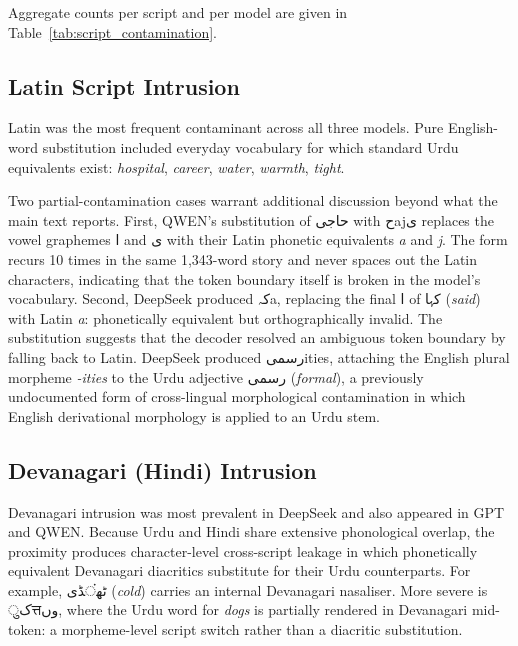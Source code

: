 \documentclass[11pt]{article}
\begin{document}
Aggregate counts per script and per model are given in
Table~\ref{tab:script_contamination}.



\subsection{Latin Script Intrusion}
\label{app:contamination_latin}

Latin was the most frequent contaminant across all three
models. Pure English-word substitution included everyday
vocabulary for which standard Urdu equivalents exist:
\textit{hospital}, \textit{career}, \textit{water},
\textit{warmth}, \textit{tight}.

Two partial-contamination cases warrant additional
discussion beyond what the main text reports. First, QWEN's
substitution of
\foreignlanguage{arabic}{حاجی} with
\foreignlanguage{arabic}{ح}aj\foreignlanguage{arabic}{ی}
replaces the vowel graphemes
\foreignlanguage{arabic}{ا} and \foreignlanguage{arabic}{ی}
with their Latin phonetic equivalents \textit{a} and
\textit{j}. The form recurs 10 times in the same
1{,}343-word story and never spaces out the Latin
characters, indicating that the token boundary itself is
broken in the model's vocabulary. Second, DeepSeek
produced \foreignlanguage{arabic}{کہ}a, replacing the
final \foreignlanguage{arabic}{ا} of
\foreignlanguage{arabic}{کہا} (\textit{said}) with Latin
\textit{a}: phonetically equivalent but orthographically
invalid. The substitution suggests that the decoder
resolved an ambiguous token boundary by falling back to
Latin. DeepSeek produced
\foreignlanguage{arabic}{رسمی}ities, attaching the
English plural morpheme \textit{-ities} to the Urdu
adjective \foreignlanguage{arabic}{رسمی}
(\textit{formal}), a previously undocumented form of
cross-lingual morphological contamination in which English
derivational morphology is applied to an Urdu stem.

\subsection{Devanagari (Hindi) Intrusion}
\label{app:contamination_devanagari}

Devanagari intrusion was most prevalent in DeepSeek and
also appeared in GPT and QWEN. Because Urdu and Hindi
share extensive phonological overlap, the proximity
produces character-level cross-script leakage in which
phonetically equivalent Devanagari diacritics substitute
for their Urdu counterparts. For example,
\foreignlanguage{arabic}{ٹھ}\foreignlanguage{hindi}{ं}\foreignlanguage{arabic}{ڈی}
(\textit{cold}) carries an internal Devanagari nasaliser.
More severe is
\foreignlanguage{arabic}{ک}\foreignlanguage{hindi}{ुत्त}\foreignlanguage{arabic}{وں},
where the Urdu word for \textit{dogs} is partially
rendered in Devanagari mid-token: a morpheme-level script
switch rather than a diacritic substitution.
\end{document}
